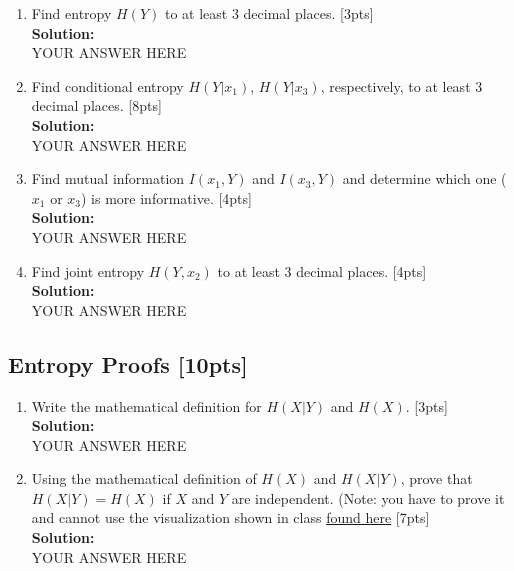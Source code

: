 \documentclass{article}
\begin{document}
\begin{enumerate}[label=(\alph*)]
\item Find entropy $H(Y)$ to at least 3 decimal places. [3pts]\bigskip \\
\textbf{Solution:}\\
YOUR ANSWER HERE
\newpage
\item Find conditional entropy $H(Y|x_1)$, $H(Y|x_3)$, respectively, to at least 3 decimal places. [8pts]\bigskip \\
\textbf{Solution:}\\
YOUR ANSWER HERE
\newpage
\item Find mutual information $I(x_1, Y)$ and $I(x_3, Y)$ and determine which one ($x_1$ or $x_3$) is more informative. [4pts]\bigskip \\
\textbf{Solution:}\\
YOUR ANSWER HERE
\newpage
\item Find joint entropy $H(Y, x_2)$ to at least 3 decimal places. [4pts]\bigskip \\
\textbf{Solution:}\\
YOUR ANSWER HERE
\newpage
\end{enumerate}

\subsection{Entropy Proofs [10pts]}
\begin{enumerate}[label=(\alph*)]
\item Write the mathematical definition for $H(X|Y)$ and $H(X)$. [3pts]\bigskip \\
\textbf{Solution:}\\
YOUR ANSWER HERE
\newpage
\item Using the mathematical definition of $H(X)$ and $H(X|Y)$, prove that $H(X|Y) = H(X)$ if $X$ and $Y$ are independent. (Note: you have to prove it and cannot use the visualization shown in class \href{https://mahdi-roozbahani.github.io/CS46417641-spring2022/other/CEandMI_Illustration.jpg}{found here} [7pts]\bigskip \\
\textbf{Solution:}\\
YOUR ANSWER HERE
\newpage
\end{enumerate}
\end{document}
